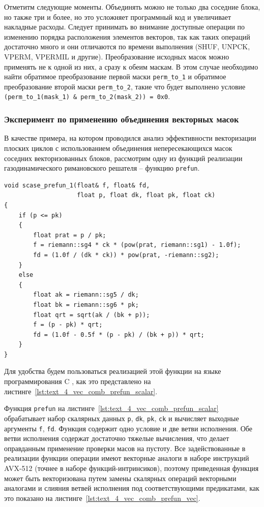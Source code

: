 Отметитм следующие моменты.
Объединять можно не только два соседние блока, но также три и более, но это усложняет программный код и увеличивает накладные расходы.
Следует принимать во внимание доступные операции по изменению порядка расположения элементов векторов, так как таких операций достаточно много и они отличаются по времени выполнения (SHUF, UNPCK, VPERM, VPERMIL и другие).
Преобразование исходных масок можно применять не к одной из них, а сразу к обеим маскам.
В этом случае необходимо найти обратимое преобразование первой маски \texttt{perm\_to\_1} и обратимое преобразование второй маски \texttt{perm\_to\_2}, такие что будет выполнено условие \texttt{(perm\_to\_1(mask\_1) \& perm\_to\_2(mask\_2)) = 0x0}.

\subsubsection{Эксперимент по применению объединения векторных масок}\label{sec:text_4_comb_mask_analyze}

В качестве примера, на котором проводился анализ эффективности векторизации плоских циклов с использованием объединения непересекающихся масок соседних векторизованных блоков, рассмотрим одну из функций реализации газодинамического римановского решателя -- функцию \texttt{prefun}.

\begin{singlespace}
\begin{lstlisting}[caption={Скалярная версия функции \texttt{prefun} из состава \\ римановского решателя.},label={lst:text_4_vec_comb_prefun_scalar}]
void scase_prefun_1(float& f, float& fd,
                    float p, float dk, float pk, float ck)
{
    if (p <= pk)
    {
        float prat = p / pk;
        f = riemann::sg4 * ck * (pow(prat, riemann::sg1) - 1.0f);
        fd = (1.0f / (dk * ck)) * pow(prat, -riemann::sg2);
    }
    else
    {
        float ak = riemann::sg5 / dk;
        float bk = riemann::sg6 * pk;
        float qrt = sqrt(ak / (bk + p));
        f = (p - pk) * qrt;
        fd = (1.0f - 0.5f * (p - pk) / (bk + p)) * qrt;
    }
}
\end{lstlisting}
\end{singlespace}

Для удобства будем пользоваться реализацией этой функции на языке программирования C \cite{riemannvecGithub}, как это представлено на листинге~\ref{lst:text_4_vec_comb_prefun_scalar}.

Функция \texttt{prefun} на листинге~\ref{lst:text_4_vec_comb_prefun_scalar} обрабатывает набор скалярных данных \texttt{p}, \texttt{dk}, \texttt{pk}, \texttt{ck} и вычисляет выходные аргументы \texttt{f}, \texttt{fd}.
Функция содержит одно условие и две ветви исполнения.
Обе ветви исполнения содержат достаточно тяжелые вычисления, что делает оправданным применение проверки масов на пустоту.
Все задействованные в реализации функции операции имеют векторные аналоги в наборе инструкций AVX-512 (точнее в наборе функций-интринсиков), поэтому приведенная функция может быть векторизована путем замены скалярных операций векторными аналогами и слияния ветвей исполнения под соответствующими предикатами, как это показано на листинге~\ref{lst:text_4_vec_comb_prefun_vec}.

